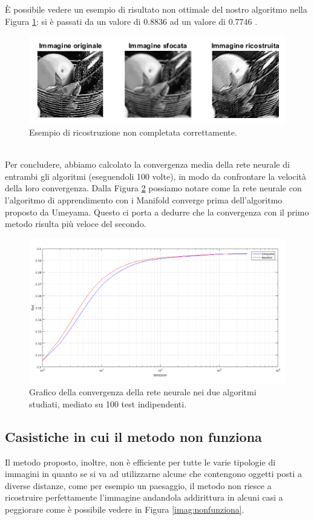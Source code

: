 \documentclass[final]{siamltex}
\begin{document}
{\`{E} possibile vedere un esempio di risultato non ottimale del nostro algoritmo nella Figura \ref{eqnonottimale}: si \`{e} passati da un valore di $0.8836$ ad un valore di $0.7746$ .
%
\begin{figure}[h!]
\begin{center}
\includegraphics[width=0.7\columnwidth]{eqnonottimale.png}
\caption{Esempio di ricostruzione non completata correttamente.}
\label{eqnonottimale}
\end{center}
\end{figure}
%
\\Per concludere, abbiamo calcolato la convergenza media della rete neurale di entrambi gli algoritmi (eseguendoli 100 volte), in modo da confrontare la velocit\`{a} della loro convergenza. Dalla Figura \ref{reteneurale} possiamo notare come la rete neurale con l'algoritmo di apprendimento con i Manifold converge prima dell'algoritmo proposto da Umeyama. Questo ci porta a dedurre che la convergenza con il primo metodo risulta pi\`{u} veloce del secondo.
%
\begin{figure}[h!]
\begin{center}
\includegraphics[width=1\columnwidth]{convergenza_reteneurale.png}
\caption{Grafico della convergenza della rete neurale nei due algoritmi studiati, mediato su 100 test indipendenti.}
\label{reteneurale}
\end{center}
\end{figure}
%
\newpage
\subsection{Casistiche in cui il metodo non funziona} \label{sec11}
Il metodo proposto, inoltre, non \`{e} efficiente per tutte le varie tipologie di immagini in quanto se si va ad utilizzarne alcune che  contengono oggetti posti a diverse distanze, come per esempio un paesaggio, il metodo non riesce a ricostruire perfettamente l'immagine andandola addirittura in alcuni casi a peggiorare come è possibile vedere in Figura \ref{imag:nonfunziona}.

}
\end{document}
